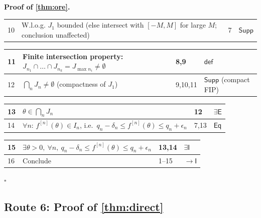 \documentclass[11pt,reqno]{amsart}
\theoremstyle{blueplain}
\renewcommand{\qedsymbol}{\textcolor{proofqed}{\ensuremath{\square}}}
\renewenvironment{proof}[1][Proof]{\par\noindent\textbf{\textcolor{proofhead}{#1.}}\par\nobreak}{\par\nobreak\hfill\qedsymbol}
\numberwithin{equation}{section}
\begin{document}
\begin{proof}[\textbf{Proof of \cref{thm:ore}}]
{\begin{tabular}{|m{0.7cm}|m{12cm}|m{1.4cm}|m{2.5cm}|}
10 & W.l.o.g. $J_1$ bounded (else intersect with $[-M,M]$ for large $M$; conclusion unaffected) & 7 & $\mathsf{Supp}$ \\
\end{tabular}%
\noindent \newline
\noindent
\begin{tabular}{|m{0.7cm}|m{12cm}|m{1.4cm}|m{2.5cm}|}
\hline
11 & Finite intersection property: $J_{n_1}\cap\dots\cap J_{n_k}=J_{\max n_i}\ne\emptyset$ & 8,9 & $\mathsf{def}$ \\ \hline
12 & $\bigcap_n J_n\ne\emptyset$ (compactness of $J_1$) & 9,10,11 & $\mathsf{Supp}$ (compact FIP) \\
\end{tabular}%
\noindent \newline
\noindent
\begin{tabular}{|m{0.7cm}|m{12cm}|m{1.4cm}|m{2.5cm}|}
\hline
13 & $\theta\in\bigcap_n J_n$ & 12 & $\exists\mathsf{E}$ \\ \hline
14 & $\forall n$: $f^{[n]}(\theta)\in I_n$, i.e.\ $q_n-\delta_n\le f^{[n]}(\theta)\le q_n+\epsilon_n$ & 7,13 & $\mathsf{Eq}$ \\
\end{tabular}%
\noindent \newline
\noindent
\begin{tabular}{|m{0.7cm}|m{12cm}|m{1.4cm}|m{2.5cm}|}
\hline
15 & $\exists\theta>0,\ \forall n,\ q_n-\delta_n\le f^{[n]}(\theta)\le q_n+\epsilon_n$ & 13,14 & $\exists\mathsf{I}$ \\ \hline
16 & Conclude & 1--15 & $\rightarrow\mathsf{I}$ \\
\end{tabular}%
}
\end{proof}

\subsection{Route 6: Proof of \cref{thm:direct}}
\end{document}
